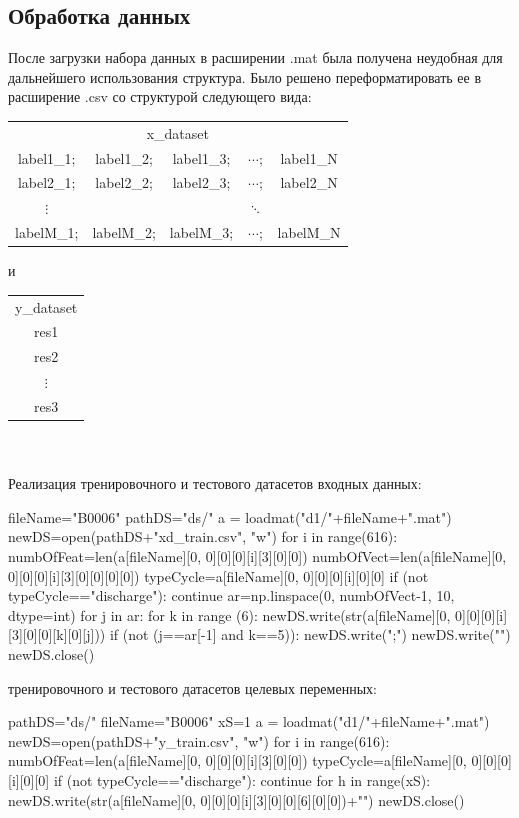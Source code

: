 \documentclass[russian,english,18pt,a4paper,reqno,dviphfm]{article}
\begin{document}
\subsection{Обработка данных}
После загрузки набора данных в расширении .mat была получена неудобная для дальнейшего использования структура. Было решено переформатировать ее в расширение .csv со структурой следующего вида:\\
\begin{tabular}{ccccc}
\multicolumn{5}{c}{x\_dataset}\\
label1\_1;&label1\_2;&label1\_3;&$\cdots$;&label1\_N\\
label2\_1;&label2\_2;&label2\_3;&$\cdots$;&label2\_N\\
$\vdots$&&&$\ddots$&\\
labelM\_1;&labelM\_2;&labelM\_3;&$\cdots$;&labelM\_N
\end{tabular} и 
\begin{tabular}{c}
y\_dataset\\
res1\\
res2\\
$\vdots$\\
res3\\
\end{tabular} \\\\
Реализация тренировочного и тестового датасетов входных данных:
\begin{python}
fileName="B0006"
pathDS="ds/"
a = loadmat("d1/"+fileName+".mat")
newDS=open(pathDS+"xd_train.csv", "w")
for i in range(616):
    numbOfFeat=len(a[fileName][0, 0][0][0][i][3][0][0])
    numbOfVect=len(a[fileName][0, 0][0][0][i][3][0][0][0][0])    
    typeCycle=a[fileName][0, 0][0][0][i][0][0]
    if (not typeCycle=="discharge"):
        continue
    ar=np.linspace(0, numbOfVect-1, 10, dtype=int)
    for j in ar:
        for k in range (6): 
            newDS.write(str(a[fileName][0, 0][0][0][i][3][0][0][k][0][j]))
            if (not (j==ar[-1] and k==5)):
                newDS.write(";")
    newDS.write("\n")
newDS.close()
\end{python}

 тренировочного и тестового датасетов целевых переменных:
\begin{python}
pathDS="ds/"
fileName="B0006"
xS=1
a = loadmat("d1/"+fileName+".mat")
newDS=open(pathDS+"y_train.csv", "w")
for i in range(616):
    numbOfFeat=len(a[fileName][0, 0][0][0][i][3][0][0])
    typeCycle=a[fileName][0, 0][0][0][i][0][0]
    if (not typeCycle=="discharge"):
        continue
    for h in range(xS):
        newDS.write(str(a[fileName][0, 0][0][0][i][3][0][0][6][0][0])+"\n")
newDS.close()
\end{python} 
\end{document}
